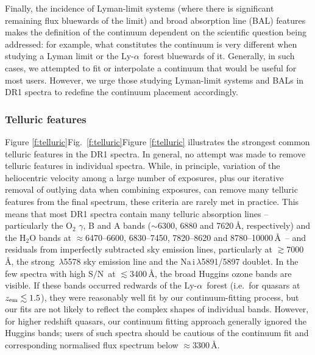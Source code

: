 \documentclass[fleqn,usenatbib,usedcolumn]{mnras}
\renewcommand{\la}{\lesssim} %
\renewcommand{\ga}{\gtrsim} %
\newcommand{\Fref}[1]{\ifhmode \ifnum\spacefactor=1001 Figure \ref{#1}\else Fig.\ \ref{#1}\fi \else Figure \ref{#1}\fi}
\newcommand{\SN}{\ensuremath{\textrm{S/N}}}
\newcommand{\lya}{\ensuremath{\textrm{Ly-}\alpha}}
\newcommand{\zem}{\ensuremath{z_\textrm{\scriptsize em}}}
\begin{document}
Finally, the incidence of Lyman-limit systems (where there is significant remaining flux bluewards of the limit) and broad absorption line (BAL) features makes the definition of the continuum dependent on the scientific question being addressed: for example, what constitutes the continuum is very different when studying a Lyman limit or the \lya\ forest bluewards of it. Generally, in such cases, we attempted to fit or interpolate a continuum that would be useful for most users. However, we urge those studying Lyman-limit systems and BALs in DR1 spectra to redefine the continuum placement accordingly.


\subsubsection{Telluric features}\label{sss:telluric}

\Fref{f:telluric} illustrates the strongest common telluric features in the DR1 spectra. In general, no attempt was made to remove telluric features in individual spectra. While, in principle, variation of the heliocentric velocity among a large number of exposures, plus our iterative removal of outlying data when combining exposures, can remove many telluric features from the final spectrum, these criteria are rarely met in practice. This means that most DR1 spectra contain many telluric absorption lines -- particularly the O$_2$ $\gamma$, B and A bands ($\sim$6300, 6880 and 7620\,\AA, respectively) and the H$_2$O bands at $\approx$6470--6600, 6830--7450, 7820--8620 and 8780--10000\,\AA\ -- and residuals from imperfectly subtracted sky emission lines, particularly at $\ga$7000\,\AA, the strong \,$\lambda$5578 sky emission line and the Na{\sc \,i}\,$\lambda$5891/5897 doublet. In the few spectra with high \SN\ at $\la$3400\,\AA, the broad Huggins ozone bands are visible. If these bands occurred redwards of the \lya\ forest (i.e.\ for quasars at $\zem\la1.5$), they were reasonably well fit by our continuum-fitting process, but our fits are not likely to reflect the complex shapes of individual bands. However, for higher redshift quasars, our continuum fitting approach generally ignored the Huggins bands; users of such spectra should be cautious of the continuum fit and corresponding normalised flux spectrum below $\approx$3300\,\AA.
\end{document}
